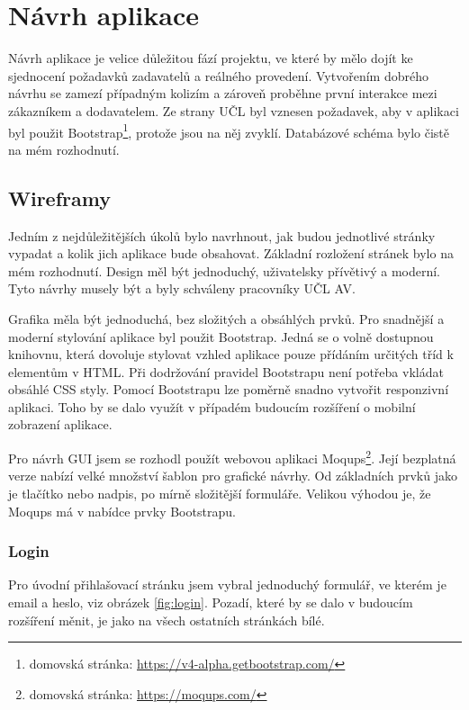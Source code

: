\chapter{Návrh aplikace}
    Návrh aplikace je velice důležitou fází projektu, ve které by mělo dojít ke sjednocení požadavků zadavatelů a reálného provedení. Vytvořením dobrého návrhu se zamezí případným kolizím a zároveň proběhne první interakce mezi zákazníkem a dodavatelem. Ze strany UČL byl vznesen požadavek, aby v aplikaci byl použit Bootstrap\footnote{domovská stránka: \url{https://v4-alpha.getbootstrap.com/}}, protože jsou na něj zvyklí. Databázové schéma bylo čistě na mém rozhodnutí.
    
    \section{Wireframy}

        Jedním z nejdůležitějších úkolů bylo navrhnout, jak budou jednotlivé stránky vypadat a kolik jich aplikace bude obsahovat. Základní rozložení stránek bylo na mém rozhodnutí. Design měl být jednoduchý, uživatelsky přívětivý a moderní. Tyto návrhy musely být a byly schváleny pracovníky UČL AV.
        
        Grafika měla být jednoduchá, bez složitých a obsáhlých prvků. Pro snadnější a moderní stylování aplikace byl použit Bootstrap. Jedná se o volně dostupnou knihovnu, která dovoluje stylovat vzhled aplikace pouze přídáním určitých tříd k elementům v HTML. Při dodržování pravidel Bootstrapu není potřeba vkládat obsáhlé CSS styly. Pomocí Bootstrapu lze poměrně snadno vytvořit responzivní aplikaci. Toho by se dalo využít v případém budoucím rozšíření o mobilní zobrazení aplikace.
        
        Pro návrh GUI jsem se rozhodl použít webovou aplikaci Moqups\footnote{domovská stránka: \url{https://moqups.com/}}. Její bezplatná verze nabízí velké množství šablon pro grafické návrhy. Od základních prvků jako je tlačítko nebo nadpis, po mírně složitější formuláře. Velikou výhodou je, že Moqups má v nabídce prvky Bootstrapu. 
        
        \subsection{Login}
            Pro úvodní přihlašovací stránku jsem vybral jednoduchý formulář, ve kterém je email a heslo, viz obrázek \ref{fig:login}. Pozadí, které by se dalo v budoucím rozšíření měnit, je jako na všech ostatních stránkách bílé.
            
